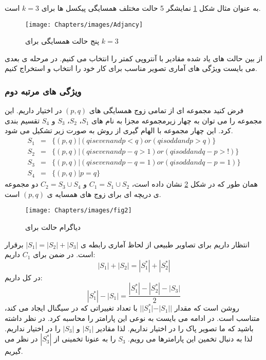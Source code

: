  به عنوان مثال شکل \ref{adjacencyState} نمایشگر 5 حالت مختلف همسایگی پیکسل ها برای $ k=3 $ است. 
 \begin{figure}[!htbp]
\centerline{\texttt{[image: Chapters/images/Adjancy]}}
\caption{پنج حالت همسایگی برای {$ k=3 $}}
\label{adjacencyState}
\end{figure}
از بین حالت های یاد شده مقادیر با آنتروپی کمتر را انتخاب می کنیم. در مرحله ی بعدی می بایست ویژگی های آماری تصویر مناسب برای کار خود را انتخاب و استخراج کنیم. 
\subsubsection{ویژگی های مرتبه دوم}
فرض کنید مجموعه ای از تمامی زوج همسایگی های $ (p,q) $ در اختیار داریم. این مجموعه را می توان به چهار زیرمجموعه مجزا به نام های $ S_{1} $، $ S_{2} $، $ S_{3} $ و $ S_{4} $ تقسیم بندی کرد. این چهار مجموعه با الهام گیری از روش  به صورت زیر تشکیل می شود.
\begin{eqnarray}
S_{1}&=&\lbrace (p,q)|(q is even and p<q) or (q is odd and p>q) \rbrace\nonumber \\
S_{2}&=&\lbrace (p,q)|(q is even and p-q>1) or (q is odd and q-p>!) \rbrace\nonumber \\
S_{3}&=&\lbrace (p,q)|(q is even and p-q=1) or (q is odd and q-p=1) \rbrace\nonumber \\
S_{4}&=&\lbrace (p,q)|p=q \rbrace
\end{eqnarray}
همان طور که در شکل \ref{StateDiagram} نشان داده است، $ C_{1}=S_{1}\cup S_{2} $ و $ C_{2}=S_{3}\cup S_{4} $ دو مجموعه ی دریچه ای برای زوج های همسایه ی $ (p,q) $ است.
\begin{figure}[!htbp]
\centerline{\texttt{[image: Chapters/images/fig2]}}
\caption{دیاگرام حالت برای {}}
\label{StateDiagram}
\end{figure}
انتظار داریم برای تصاویر طبیعی از لحاظ آماری رابطه ی {$ |S_{1}|=|S_{2}| +|S_{3}|$} برقرار است. در ضمن برای $ C_{1} $ داریم: 
\begin{equation}
|S_{1}| +|S_{2}|=|S_{1}^{*}| +|S_{2}^{*}| 
\end{equation}
در کل داریم:
\begin{equation}
|S_{1}^{*}| - |S_{1}|=\frac{|S_{1}^{*}| - |S_{2}^{*}|-|S_{3}|}{2}
\end{equation}
روشن است که مقدار $ ||S_{1}^{*}| - |S_{1}|| $ با تعداد تغییراتی که  در سیگنال ایجاد می کند، متناسب است. در ادامه می بایست به نوعی این پارامتر را محاسبه کرد. در نظر داشته باشید که ما تصویر پاک را در اختیار نداریم. لذا مقادیر $ |S_{1}| $ و $| S_{3}| $ را در اختیار نداریم. لذا به دنبال تخمین این پارامترها می رویم. $ S_{3} $ را به عنونا تخمینی از $ |S_{3}^{*}| $ در نظر می گیریم. 

